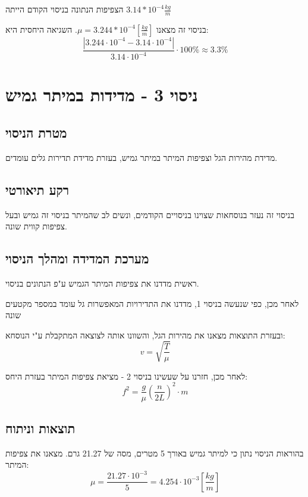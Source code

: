 \documentclass[14pt]{extarticle}
\begin{document}
הצפיפות הנתונה בניסוי הקודם הייתה $3.14 * 10^{-4} \frac{kg}{m}$

בניסוי זה מצאנו $\mu = 3.244 * 10^{-4} [\frac{kg}{m}]$. השגיאה היחסית היא:
\begin{equation*}
    \frac{|3.244 \cdot 10^{-4} - 3.14 \cdot 10^{-4}|}{3.14 \cdot 10^{-4}} \cdot 100\% \approx 3.3\%
\end{equation*}

\section*{ניסוי 3 - מדידות במיתר גמיש}
\subsection*{מטרת הניסוי}
מדידת מהירות הגל וצפיפות המיתר במיתר גמיש, בעזרת מדידת תדירות גלים עומדים.
\subsection*{רקע תיאורטי}
בניסוי זה נעזר בנוסחאות שצוינו בניסויים הקודמים, ונשים לב שהמיתר בניסוי זה גמיש ובעל צפיפות קווית שונה.
\subsection*{מערכת המדידה ומהלך הניסוי}
ראשית מדדנו את צפיפות המיתר הגמיש ע"פ הנתונים בניסוי.

לאחר מכן, כפי שנעשה בניסוי 1, מדדנו את התדירויות המאפשרות גל עומד במספר מקטעים שונה

ובעזרת התוצאות מצאנו את מהירות הגל, והשוונו אותה לצוצאה המתקבלת ע"י הנוסחא:
\begin{equation*}
    v= \sqrt{\frac{T}{\mu}}
\end{equation*}

לאחר מכן, חזרנו על שעשינו בניסוי 2 - מציאת צפיפות המיתר בעזרת היחס:
\begin{equation*}
    f^2 = \frac{g}{\mu} (\frac{n}{2L})^2 \cdot m
\end{equation*}

\subsection*{תוצאות וניתוח}
בהוראות הניסוי נתון כי למיתר גמיש באורך 5 מטרים, מסה של 21.27 גרם. מצאנו את צפיפות המיתר:
\begin{equation*}
    \mu = \frac{21.27 \cdot 10^{-3}}{5} = 4.254 \cdot 10^{-3} [\frac{kg}{m}]
\end{equation*}
\end{document}
